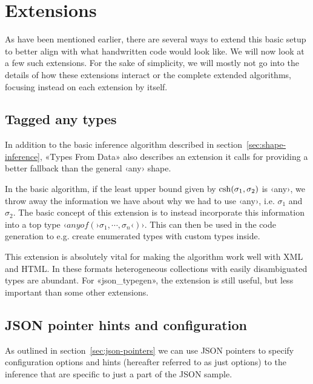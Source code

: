 \section{Extensions}
\label{sec:extensions}

As have been mentioned earlier, there are several ways to extend this basic setup to better align with what handwritten code would look like. We will now look at a few such extensions. For the sake of simplicity, we will mostly not go into the details of how these extensions interact or the complete extended algorithms, focusing instead on each extension by itself.

\subsection{Tagged any types}
\label{sec:tagged-any}

In addition to the basic inference algorithm described in section~\ref{sec:shape-inference}, «Types From Data»\cite{fsharp-types-from-data} also describes an extension it calls  for providing a better fallback than the general ‹any› shape.

In the basic algorithm, if the least upper bound given by $\operatorname{csh}(\sigma_1, \sigma_2)$ is ‹any›, we throw away the information we have about why we had to use ‹any›, i.e. $\sigma_1$ and $\sigma_2$. The basic concept of this extension is to instead incorporate this information into a top type $‹anyof(›\sigma_1, {\cdots}, \sigma_n‹)›$. This can then be used in the code generation to e.g. create enumerated types with custom types inside.



This extension is absolutely vital for making the algorithm work well with XML and HTML. In these formats heterogeneous collections with easily disambiguated types are abundant. For «json_typegen», the extension is still useful, but less important than some other extensions.

\subsection{JSON pointer hints and configuration}
\label{sec:ext-json-pointers}

As outlined in section~\ref{sec:json-pointers} we can use JSON pointers to specify configuration options and hints (hereafter referred to as just options) to the inference that are specific to just a part of the JSON sample.

